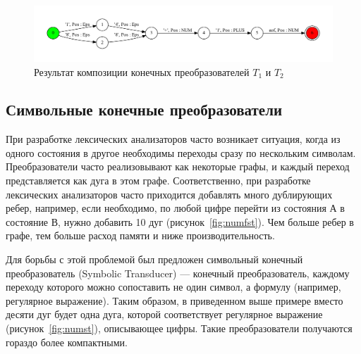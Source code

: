 \begin{figure}[h!]
        \includegraphics[width=\linewidth]{Gumin/pictures/res_.pdf}
        \caption{Результат композиции конечных преобразователей $T_1$ и $T_2$}
        \label{compose3} 
\end{figure}

\subsection{Символьные конечные преобразователи}
При разработке лексических анализаторов часто возникает ситуация, когда из одного состояния в другое необходимы переходы сразу по нескольким символам. Преобразователи часто реализовывают как некоторые графы, и каждый переход представляется как дуга в этом графе. Соответственно, при разработке лексических анализаторов часто приходится добавлять много дублирующих ребер, например, если необходимо, по любой цифре перейти из состояния А в состояние В, нужно добавить 10 дуг (рисунок~\ref{fig:numfst}). Чем больше ребер в графе, тем больше расход памяти и ниже производительность.

Для борьбы с этой проблемой был предложен символьный конечный преобразователь (Symbolic Transducer) --- конечный преобразователь,  каждому переходу которого можно сопоставить не один символ, а формулу (например, регулярное выражение). Таким образом, в приведенном выше примере вместо десяти дуг будет одна дуга, которой соответствует регулярное выражение (рисунок~\ref{fig:numst}), описывающее цифры. Такие преобразователи получаются гораздо более компактными. 

